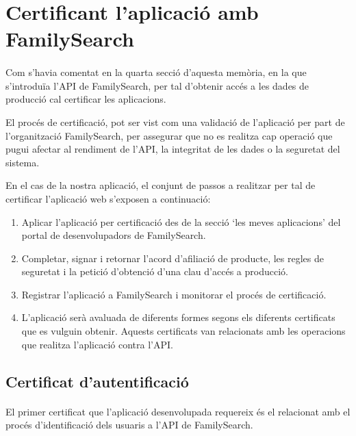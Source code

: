 \section{Certificant l'aplicació amb FamilySearch}

    \paragraph{}
    Com s'havia comentat en la quarta secció d'aquesta memòria, en la que s'introduïa l'API de FamilySearch, per tal d'obtenir accés a les dades de producció cal certificar les aplicacions.

    El procés de certificació, pot ser vist com una validació de l'aplicació per part de l'organització FamilySearch, per assegurar que no es realitza cap operació que pugui afectar al rendiment de l'API, la integritat de les dades o la seguretat del sistema.

    En el cas de la nostra aplicació, el conjunt de passos a realitzar per tal de certificar l'aplicació web s'exposen a continuació:

    \begin{enumerate}
        \item Aplicar l'aplicació per certificació des de la secció `les meves aplicacions' del portal de desenvolupadors de FamilySearch.
        \item Completar, signar i retornar l'acord d'afiliació de producte, les regles de seguretat i la petició d'obtenció d'una clau d'accés a producció.
        \item Registrar l'aplicació a FamilySearch i monitorar el procés de certificació.
        \item L'aplicació serà avaluada de diferents formes segons els diferents certificats que es vulguin obtenir. Aquests certificats van relacionats amb les operacions que realitza l'aplicació contra l'API.
    \end{enumerate}


    \subsection{Certificat d'autentificació}

    \paragraph{}
    El primer certificat que l'aplicació desenvolupada requereix és el relacionat amb el procés d'identificació dels usuaris a l'API de FamilySearch.

